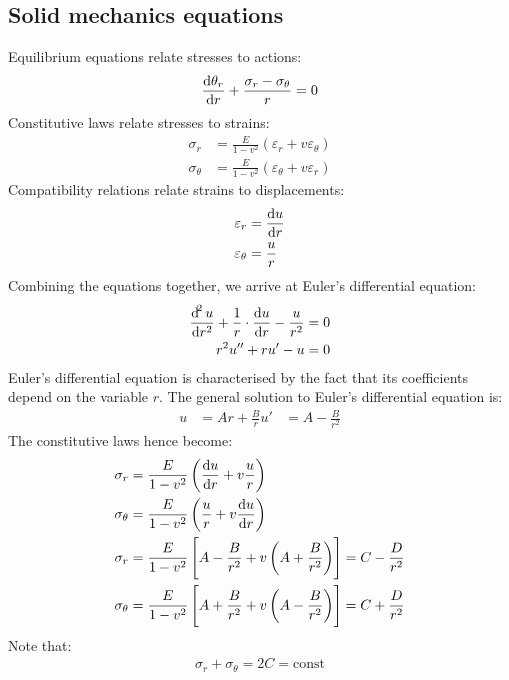 \subsection{Solid mechanics equations}
Equilibrium equations relate stresses to actions:
\begin{align}
  \frac{\dif \theta_r}{\dif r} + \frac{\sigma_r - \sigma_{\theta}}{r} = 0
\end{align}
Constitutive laws relate stresses to strains:
\begin{align}
  \sigma_r        & = \frac{E}{1-v^2}\left(\varepsilon_r + v \varepsilon_{\theta}\right) \\
  \sigma_{\theta} & = \frac{E}{1-v^2}\left(\varepsilon_{\theta}+v\varepsilon_{r}\right)
\end{align}
Compatibility relations relate strains to displacements:
\begin{align}
  \varepsilon_r        & = \frac{\dif u}{\dif r} \\
  \varepsilon_{\theta} & = \frac{u}{r}
\end{align}
Combining the equations together, we arrive at Euler's differential equation:
\begin{align}
  \frac{\dif^2 u}{\dif r^2} + \frac{1}{r}\cdot\frac{\dif u}{\dif r} - \frac{u}{r^2} & = 0 \\
  r^2 u'' + r u' - u                                                                & = 0
\end{align}
Euler's differential equation is characterised by the fact that its coefficients depend on the variable $r$. The general solution to Euler's differential equation is:
\begin{align}
  u  & = Ar + \frac{B}{r}
  u' & = A - \frac{B}{r^2}
\end{align}
The constitutive laws hence become:
\begin{align}
  \sigma_r        & = \frac{E}{1-v^2}\left(\frac{\dif u}{\dif r} + v \frac{u}{r}\right)                                   \\
  \sigma_{\theta} & = \frac{E}{1-v^2}\left(\frac{u}{r}+v\frac{\dif u}{\dif r}\right)                                      \\
  \sigma_r        & = \frac{E}{1-v^2}\left[A - \frac{B}{r^2} + v\left(A + \frac{B}{r^2}\right)\right] = C - \frac{D}{r^2} \\
  \sigma_{\theta} & = \frac{E}{1-v^2} \left[A + \frac{B}{r^2} + v\left(A-\frac{B}{r^2}\right)\right] = C + \frac{D}{r^2}
\end{align}
Note that:
\begin{align}
  \sigma_r + \sigma_{\theta} = 2C = \textrm{const}
\end{align}
